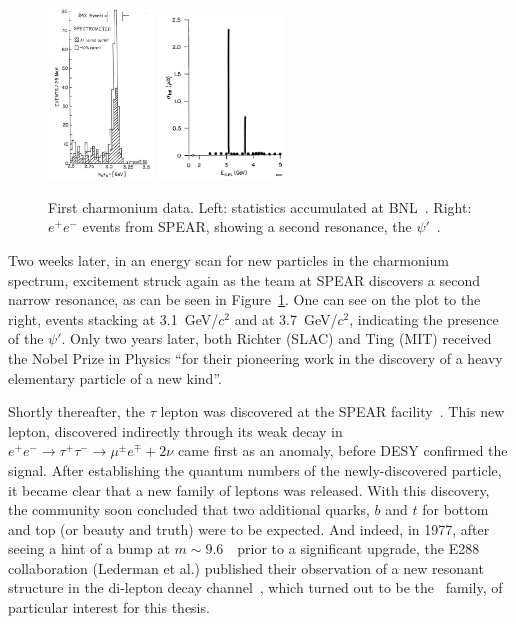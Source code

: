 \begin{figure}[h]
\begin{center}
  \includegraphics[width=0.25\textwidth]{Chapters/pQCD/psi_bnl.png}
  \includegraphics[width=0.3\textwidth]{Chapters/pQCD/psi_slac.png}
 \caption{First charmonium data. Left: statistics accumulated at
   BNL~\cite{psi_bnl}. Right: $e^{+}e^{-}$ events from SPEAR, showing a second
   resonance, the $\psi'$~\cite{psi_slac}.}
 \label{fig:psi}
\end{center}
\end{figure}

Two weeks later, in an energy scan for new particles in the charmonium
spectrum, excitement
struck again as the team at SPEAR discovers a second narrow resonance,
as can be seen in Figure~\ref{fig:psi}. One can see on the plot to the
right, events stacking at 3.1~GeV/$c^2$ and at 3.7~GeV/$c^2$, indicating the
presence of the $\psi'$. Only two years later, both Richter (SLAC) and
Ting (MIT) received the Nobel Prize in Physics ``for their pioneering
work in the discovery of a heavy elementary particle of a new kind''.

Shortly thereafter, the $\tau$ lepton was discovered at the SPEAR
facility~\cite{Agashe:2014kda}. This new lepton, discovered indirectly
through its weak
decay in $e^{+}e^{-}\to\tau^{+}\tau^{-}\to\mu^{\pm}e^{\mp}+2\nu$ came
first as an anomaly, before DESY confirmed the
signal. After establishing the quantum numbers of the newly-discovered
particle, it became clear that a new family of leptons was
released. With this discovery, the community soon concluded that two
additional quarks, $b$ and $t$ for bottom and top (or beauty and
truth) were to be expected. And indeed, in 1977, after seeing a hint
of a bump at $m \sim 9.6$~\unitMass\ prior to a significant upgrade, the
E288 collaboration (Lederman et al.) published their observation of
a new resonant structure in the di-lepton decay
channel~\cite{lederman}, which turned out to be the \PgU\ family, of particular interest for this thesis. 

